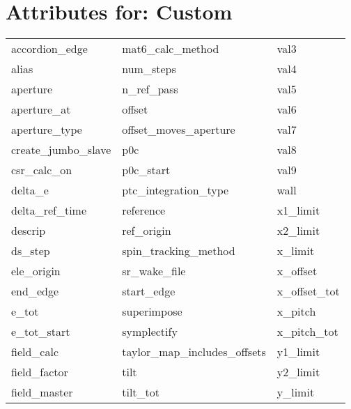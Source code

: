  \section{Attributes for: Custom}
 \label{s:list.custom}
 
 \begin{tabular}{lll} \toprule
accordion_edge              & mat6_calc_method            & val3                        \\
alias                       & num_steps                   & val4                        \\
aperture                    & n_ref_pass                  & val5                        \\
aperture_at                 & offset                      & val6                        \\
aperture_type               & offset_moves_aperture       & val7                        \\
create_jumbo_slave          & p0c                         & val8                        \\
csr_calc_on                 & p0c_start                   & val9                        \\
delta_e                     & ptc_integration_type        & wall                        \\
delta_ref_time              & reference                   & x1_limit                    \\
descrip                     & ref_origin                  & x2_limit                    \\
ds_step                     & spin_tracking_method        & x_limit                     \\
ele_origin                  & sr_wake_file                & x_offset                    \\
end_edge                    & start_edge                  & x_offset_tot                \\
e_tot                       & superimpose                 & x_pitch                     \\
e_tot_start                 & symplectify                 & x_pitch_tot                 \\
field_calc                  & taylor_map_includes_offsets & y1_limit                    \\
field_factor                & tilt                        & y2_limit                    \\
field_master                & tilt_tot                    & y_limit                     \\

\end{tabular}
